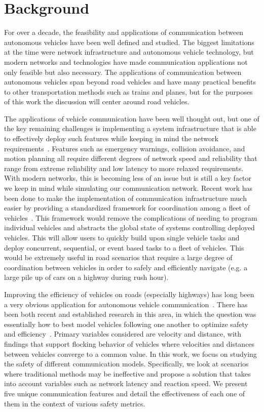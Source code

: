\section{Background}

For over a decade, the feasibility and applications of communication between autonomous
vehicles have been well defined and studied. The biggest limitations at the time were
network infrastructure and autonomous vehicle technology, but modern networks and technologies
have made communication applications not only feasible but also necessary. 
The applications of communication between autonomous vehicles
span beyond road vehicles and have many practical benefits to other transportation methods
such as trains and planes, but for the purposes of this work the discussion will center
around road vehicles.

The applications of vehicle communication have been well thought out, but one of the key remaining
challenges is implementing a system infrastructure that is able to
effectively deploy such features while keeping in mind the network requirements~\cite{willke2009survey}.
Features such as emergency warnings, collision avoidance, and motion planning
all require different degrees of network speed and reliability that range from
extreme reliability and low latency to more relaxed requirements. With modern networks,
this is becoming less of an issue but is still a key factor we keep in mind while
simulating our communication network.
Recent work has been done to make
the implementation of communication infrastructure much easier by providing a standardized
framework for coordination among a fleet of vehicles~\cite{keila2018}.
This framework would remove
the complications of needing to program individual vehicles and abstracts the global
state of systems controlling deployed vehicles. This will allow users to quickly build
upon single vehicle tasks and deploy concurrent, sequential, or event based tasks
to a fleet of vehicles. This would be extremely useful in road scenarios that require
a large degree of coordination between vehicles in order to safely and efficiently
navigate (e.g. a large pile up of cars on a highway during rush hour).

Improving the efficiency of vehicles on roads (especially highways) has long been a
very obvious application for autonomous vehicle communication~\cite{murray2007recent}.
There has been both recent and established research in this area, in which the question
was essentially how to best model vehicles following one another to
optimize safety and efficiency~\cite{ou2017extended, tanner2003coordination}.
Primary variables considered are velocity
and distance, with findings that support flocking behavior of vehicles where velocities
and distances between vehicles converge to a common value.
In this work, we focus on studying the safety of different communication models.
Specifically, we look at scenarios where traditional methods may be ineffective and propose
a solution that takes into account variables such as network latency and reaction speed.
We present five unique communication features and detail the effectiveness of each one of them
in the context of various safety metrics.